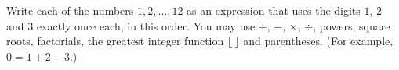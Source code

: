 Write each of the numbers $1,2,\dots,12$ as an expression that uses the digits $1$, $2$ and $3$ exactly once each, in this order. You may use $+$, $-$, $\times$, $\div$, powers, square roots, factorials, the greatest integer function $\lfloor\ \rfloor$ and parentheses. (For example, $0=1+2-3$.)
